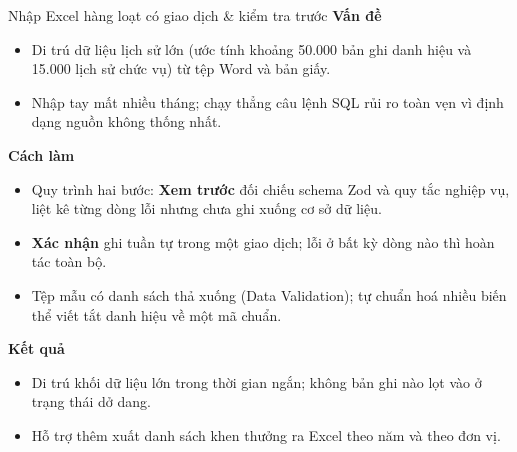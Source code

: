 \documentclass[aspectratio=43,xcolor=table]{beamer}
\begin{document}
\begin{frame}{Nhập Excel hàng loạt có giao dịch \& kiểm tra trước}
  \footnotesize
  \textbf{\textcolor{hustred}{Vấn đề}}
  \begin{itemize}\scriptsize
    \item Di trú dữ liệu lịch sử lớn (ước tính khoảng 50.000 bản ghi danh hiệu và 15.000 lịch sử chức vụ) từ tệp Word và bản giấy.
    \item Nhập tay mất nhiều tháng; chạy thẳng câu lệnh SQL rủi ro toàn vẹn vì định dạng nguồn không thống nhất.
  \end{itemize}

  \textbf{\textcolor{hustred}{Cách làm}}
  \begin{itemize}\scriptsize
    \item Quy trình hai bước: \textbf{Xem trước} đối chiếu schema Zod và quy tắc nghiệp vụ, liệt kê từng dòng lỗi nhưng chưa ghi xuống cơ sở dữ liệu.
    \item \textbf{Xác nhận} ghi tuần tự trong một giao dịch; lỗi ở bất kỳ dòng nào thì hoàn tác toàn bộ.
    \item Tệp mẫu có danh sách thả xuống (Data Validation); tự chuẩn hoá nhiều biến thể viết tắt danh hiệu về một mã chuẩn.
  \end{itemize}

  \textbf{\textcolor{hustred}{Kết quả}}
  \begin{itemize}\scriptsize
    \item Di trú khối dữ liệu lớn trong thời gian ngắn; không bản ghi nào lọt vào ở trạng thái dở dang.
    \item Hỗ trợ thêm xuất danh sách khen thưởng ra Excel theo năm và theo đơn vị.
  \end{itemize}
\end{frame}
\end{document}
